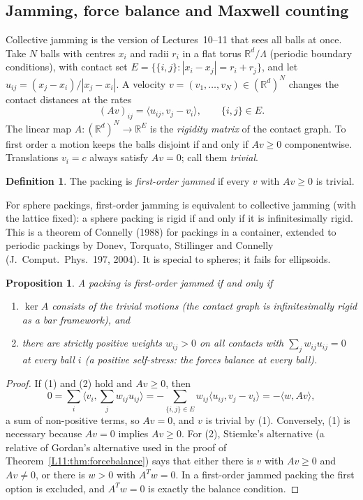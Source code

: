 \documentclass[11pt,openany]{book}
\theoremstyle{plain}
\newtheorem{proposition}[theorem]{Proposition}
\theoremstyle{definition}
\newtheorem{definition}[theorem]{Definition}
\theoremstyle{remark}
\newcommand{\R}{\mathbb{R}}
\newcommand{\abs}[1]{\left\lvert #1 \right\rvert}
\newcommand{\ip}[2]{\langle #1, #2\rangle}
\begin{document}
\subsection{Jamming, force balance and Maxwell counting}

Collective jamming is the version of Lectures~10--11 that sees all balls at once. Take $N$ balls with
centres $x_i$ and radii $r_i$ in a flat torus $\R^d/\Lambda$ (periodic boundary conditions), with contact
set $E=\{\{i,j\}:\abs{x_i-x_j}=r_i+r_j\}$, and let $u_{ij}=(x_j-x_i)/\abs{x_j-x_i}$. A velocity
$v=(v_1,\dots,v_N)\in(\R^d)^N$ changes the contact distances at the rates
\[
  (Av)_{ij}=\ip{u_{ij}}{v_j-v_i},\qquad\{i,j\}\in E.
\]
The linear map $A\colon(\R^d)^N\to\R^E$ is the \emph{rigidity matrix} of the contact graph. To first order a
motion keeps the balls disjoint if and only if $Av\ge0$ componentwise. Translations $v_i=c$ always
satisfy $Av=0$; call them \emph{trivial}.

\begin{definition}\label{SM:def:jam}
The packing is \emph{first-order jammed} if every $v$ with $Av\ge0$ is trivial.
\end{definition}

For sphere packings, first-order jamming is equivalent to collective jamming (with the lattice fixed):
a sphere packing is rigid if and only if it is infinitesimally rigid. This is a theorem of Connelly (1988)
for packings in a container, extended to periodic packings by Donev, Torquato, Stillinger and Connelly
(J.~Comput.\ Phys.\ 197, 2004). It is special to spheres; it fails for ellipsoids.

\begin{proposition}\label{SM:prop:jam}
A packing is first-order jammed if and only if
\begin{enumerate}[nosep]
\item $\ker A$ consists of the trivial motions (the contact graph is infinitesimally rigid as a bar
  framework), and
\item there are \emph{strictly positive} weights $w_{ij}>0$ on all contacts with
  $\sum_jw_{ij}u_{ij}=0$ at every ball $i$ (a positive self-stress: the forces balance at every ball).
\end{enumerate}
\end{proposition}

\begin{proof}
If (1) and (2) hold and $Av\ge0$, then
\[
  0=\sum_i\Big\langle v_i,\sum_jw_{ij}u_{ij}\Big\rangle=-\sum_{\{i,j\}\in E}w_{ij}\ip{u_{ij}}{v_j-v_i}=-\ip{w}{Av},
\]
a sum of non-positive terms, so $Av=0$, and $v$ is trivial by (1). Conversely, (1) is necessary because
$Av=0$ implies $Av\ge0$. For (2), Stiemke's alternative (a relative of Gordan's alternative used in the
proof of Theorem~\ref{L11:thm:forcebalance}) says that either there is $v$ with $Av\ge0$ and $Av\ne0$, or
there is $w>0$ with $A^Tw=0$. In a first-order jammed packing the first option is excluded, and $A^Tw=0$
is exactly the balance condition.
\end{proof}
\end{document}
